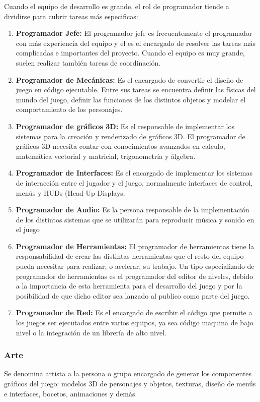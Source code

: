 Cuando el equipo de desarrollo es grande, el rol de programador tiende a dividirse para cubrir tareas más especificas:
\begin{enumerate}
\item \textbf{Programador Jefe:} El programador jefe es frecuentemente el programador con más experiencia del equipo y el es el encargado de resolver las tareas más complicadas e importantes del proyecto. Cuando el equipo es muy grande, suelen realizar también tareas de coordinación.
\item \textbf{Programador de Mecánicas:} Es el encargado de convertir el diseño de juego en código ejecutable. Entre sus tareas se encuentra definir las físicas del mundo del juego, definir las funciones de los distintos objetos y modelar el comportamiento de los personajes.
\item \textbf{Programador de gráficos 3D:} Es el responsable de implementar los sistemas para la creación y renderizado de gráficos 3D. El programador de gráficos 3D necesita contar con conocimientos avanzados en calculo, matemática vectorial y matricial, trigonometría y álgebra.
\item \textbf{Programador de Interfaces:} Es el encargado de implementar los sistemas de interacción entre el jugador y el juego, normalmente interfaces de control, menús y HUDs (Head-Up Displays. 
\item \textbf{Programador de Audio:} Es la persona responsable de la implementación de los distintos sistemas que se utilizarán para reproducir música y sonido en el juego
\item \textbf{Programador de Herramientas:} El programador de herramientas tiene la responsabilidad de crear las distintas herramientas que el resto del equipo pueda necesitar para realizar, o acelerar, su trabajo. Un tipo especializado de programador de herramientas es el programador del editor de niveles, debido a la importancia de esta herramienta para el desarrollo del juego y por la posibilidad de que dicho editor sea lanzado al publico como parte del juego.
\item \textbf{Programador de Red:} Es el encargado de escribir el código que permite a los juegos ser ejecutados entre varios equipos, ya sea código maquina de bajo nivel o la integración de un librería de alto nivel.
\end{enumerate}

\subsubsection{Arte}
Se denomina artista a la persona o grupo encargado de generar los componentes gráficos del juego: modelos 3D de personajes y objetos, texturas, diseño de menús e interfaces, bocetos, animaciones y demás.


